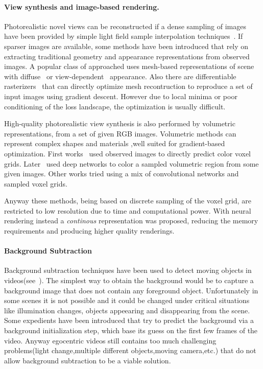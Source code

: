  \paragraph{View synthesis and image-based rendering.} Photorealistic novel views 
 can be reconstructed if a dense sampling of images have been provided by 
 simple light field sample interpolation techniques~\cite{nerf21,nerf5}.
 If sparser images are available, some methods have been introduced that 
 rely on extracting traditional geometry and appearance representations
 from observed images. A popular class of approached uses mesh-based representations
 of scene with diffuse~\cite{nerf48} or view-dependent~\cite{nerf2} appearance. Also there are differentiable
 rasterizers~\cite{nerf4,nerf10,nerf23} that can directly optimize mesh recontruction to reproduce
 a set of input images using gradient descent. However due to local minima or 
 poor conditioning of the loss landscape, the optimization is usually difficult.
 
 High-quality photorealistic view synthesis is also performed by volumetric representations,
 from a set of given RGB images. Volumetric methods can represent complex shapes and materials
 ,well suited for gradient-based optimization. First works~\cite{nerf19} used observed images to directly predict color voxel grids.
 Later~\cite{nerf9,nerf13,nerf17} used deep networks to color a sampled volumetric region from some given images.
 Other works tried using a mix of convolutional networks and sampled voxel grids.
 
 Anyway these methods, being based on discrete sampling of the voxel grid, are restricted to low resolution due to time 
 and computational power. With neural rendering instead a \textit{continous} representation was proposed, reducing 
 the memory requirements and producing higher quality renderings.
 
\paragraph{Background Subtraction}
Background subtraction techniques have been used to detect moving objects 
in videos(see~\cite{ndiff_2}). The simplest way to obtain the background would be to capture
a background image that does not contain any foreground object. Unfortunately in some scenes
it is not possible and it could be changed under critical situations like illumination
changes, objects appeearing and disappearing from the scene. Some expedients have been
introduced that try to predict the background via a background initialization step, which base
its guess on the first few frames of the video. Anyway egocentric videos still contains too much
challenging problems(light change,multiple different objects,moving camera,etc.) that do not allow background subtraction to be a viable solution.


